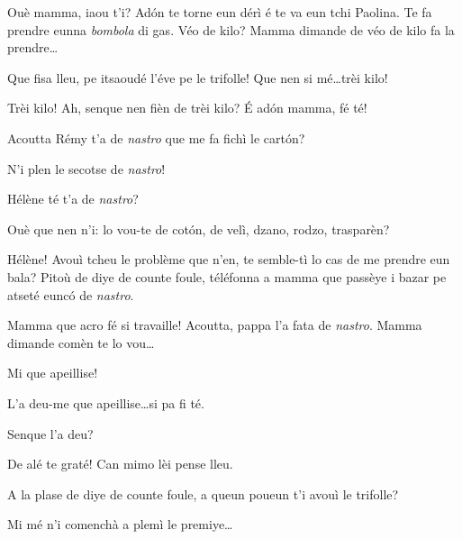 \begin{drama}

\Remyspeaks Ouè mamma, iaou t'i? Ad\'on te torne eun dérì é te va eun tchi Paolina. Te fa prendre eunna \textit{bombola} di gas. Véo de kilo?  Mamma dimande de véo de kilo fa la prendre\ldots

\Cesarspeaks{} Que fisa lleu, pe itsaoudé l'éve pe le trifolle! Que nen si mé\ldots trèi kilo!

\Remyspeaks {} Trèi kilo! Ah, senque nen fièn de trèi kilo? É ad\'on mamma, fé té!


\Cesarspeaks{}	Acoutta Rémy t'a de \textit{nastro} que me fa fichì le cart\'on?

\Remyspeaks{} N'i plen le secotse de \textit{nastro}! 

\Cesarspeaks {} Hélène té t'a de \textit{nastro}?

\Helenespeaks  {} Ouè que nen n'i: lo vou-te de cot\'on, de velì, dzano, rodzo, trasparèn?

\Cesarspeaks{} Hélène! Avouì tcheu le problème que n'en, te semble-tì lo cas de me prendre eun bala? Pitoù de diye de counte foule,  téléfonna a mamma que passèye i bazar pe atseté eunc\'o de \textit{nastro}.


\Helenespeaks Mamma que acro fé si travaille! Acoutta, pappa l'a fata de \textit{nastro}.  Mamma dimande comèn te lo vou\ldots

\Cesarspeaks{} Mi que apeillise!

\Helenespeaks {} L'a deu-me que apeillise\ldots si pa fi té.


\Cesarspeaks Senque l'a deu?

\Helenespeaks{} De alé te graté! Can mimo lèi pense lleu.

\Cesarspeaks A la plase de diye de counte foule, a queun poueun t'i avouì le trifolle?

\Helenespeaks  Mi mé n'i comenchà a plemì le premiye\ldots 


\end{drama}
